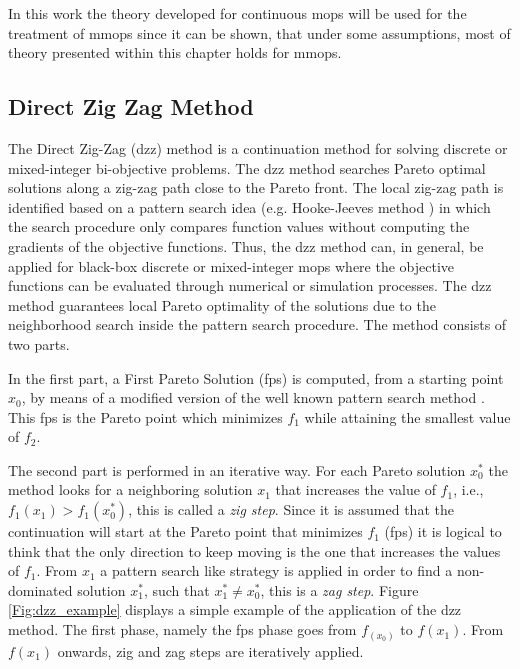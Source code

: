 In this work the theory developed for continuous \glspl{mop} will be used for the treatment of \glspl{mmop} since it can be shown, that under some assumptions, most of theory presented within this chapter holds for \glspl{mmop}.

\subsection{Direct Zig Zag Method}
\label{sec:dzz_method}

The Direct Zig-Zag (\gls{dzz}) method \cite{zigzag_discrete} is a continuation method for solving discrete or mixed-integer bi-objective problems. The \gls{dzz} method searches Pareto optimal solutions along a zig-zag path close to the Pareto front. The local zig-zag path is identified based on a pattern search idea (e.g. Hooke-Jeeves method \cite{hooke_jeeves}) in which the search procedure only compares function values without computing the gradients of the objective functions. Thus, the \gls{dzz} method can, in general, be applied for black-box discrete or mixed-integer \glspl{mop} where the objective functions can be evaluated through numerical or simulation processes. The \gls{dzz} method guarantees local Pareto optimality of the solutions due to the neighborhood search inside the pattern search procedure. The method consists of two parts.

In the first part, a First Pareto Solution (\gls{fps}) is computed, from a starting point $x_0$, by means of a modified version of the well known pattern search method \cite{hooke_jeeves}. This \gls{fps} is the Pareto point which minimizes $f_1$ while attaining the smallest value of $f_2$.

The second part is performed in an iterative way. For each Pareto solution $x_0^*$ the method looks for a neighboring solution $x_1$ that increases the value of $f_1$, i.e., $f_1(x_1) > f_1(x_0^*)$, this is called a \textit{zig step}. Since it is assumed that the continuation will start  at the Pareto point that minimizes $f_1$ (\gls{fps}) it is logical to think that the only direction to keep moving is the one that increases the values of $f_1$.  From $x_1$ a pattern search like strategy is applied in order to find a non-dominated solution $x_1^*$, such that $x_1^* \neq x_0^*$, this is a \textit{zag step}. Figure \ref{Fig:dzz_example} displays a simple example of the application of the \gls{dzz} method. The first phase, namely the \gls{fps} phase goes from $f_(x_0)$ to $f(x_1)$. From $f(x_1)$ onwards, zig and zag steps are iteratively applied.

